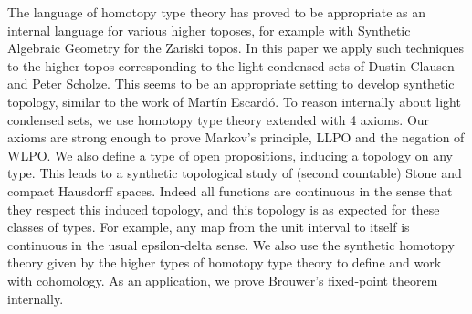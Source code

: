 The language of homotopy type theory has proved to be appropriate as an internal language for various higher toposes, 
for example with Synthetic Algebraic Geometry for the Zariski topos.
In this paper we apply such techniques to the higher topos corresponding to the light condensed sets 
of Dustin Clausen and Peter Scholze.
This seems to be an appropriate setting to develop synthetic topology, similar to the work of 
Martín Escardó.
To reason internally about light condensed sets, we use homotopy type theory extended with 4 axioms.
Our axioms are strong enough to prove Markov's principle, LLPO and the negation of WLPO. 
We also define a type of open propositions, inducing a topology on any type. 
This leads to a synthetic topological study of (second countable)
Stone and compact Hausdorff spaces. 
Indeed all functions are continuous in the sense that they respect this induced topology, 
and this topology is as expected for these classes of types.
For example, any map from the unit interval to itself is continuous in the usual epsilon-delta sense.
We also use the synthetic homotopy theory 
given by the higher types of homotopy type theory to define and 
work with cohomology.
As an application, we prove Brouwer's fixed-point theorem
internally. 
